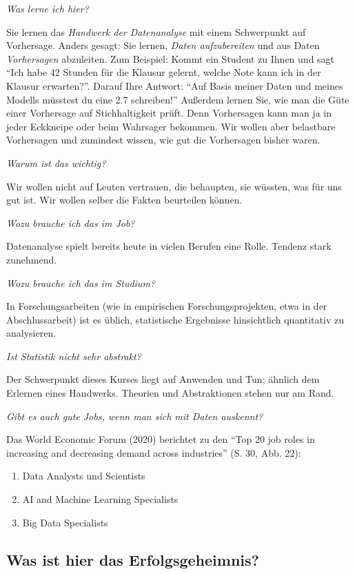 \documentclass[
  letterpaper,
  oneside,
  open=any]{scrbook}
\providecommand{\tightlist}{%
  \setlength{\itemsep}{0pt}\setlength{\parskip}{0pt}}\usepackage{longtable,booktabs,array}
\theoremstyle{definition}
\theoremstyle{definition}
\theoremstyle{definition}
\theoremstyle{remark}
\begin{document}
\emph{Was lerne ich hier?}

Sie lernen das \emph{Handwerk der Datenanalyse} mit einem Schwerpunkt
auf Vorhersage. Anders gesagt: Sie lernen, \emph{Daten aufzubereiten}
und aus Daten \emph{Vorhersagen} abzuleiten. Zum Beispiel: Kommt ein
Student zu Ihnen und sagt \enquote{Ich habe 42 Stunden für die Klausur
gelernt, welche Note kann ich in der Klausur erwarten?}. Darauf Ihre
Antwort: \enquote{Auf Basis meiner Daten und meines Modells müsstest du
eine 2.7 schreiben!} Außerdem lernen Sie, wie man die Güte einer
Vorhersage auf Stichhaltigkeit prüft. Denn Vorhersagen kann man ja in
jeder Eckkneipe oder beim Wahrsager bekommen. Wir wollen aber belastbare
Vorhersagen und zumindest wissen, wie gut die Vorhersagen bisher waren.

\emph{Warum ist das wichtig?}

Wir wollen nicht auf Leuten vertrauen, die behaupten, sie wüssten, was
für uns gut ist. Wir wollen selber die Fakten beurteilen können.

\emph{Wozu brauche ich das im Job?}

Datenanalyse spielt bereits heute in vielen Berufen eine Rolle. Tendenz
stark zunehmend.

\emph{Wozu brauche ich das im Studium?}

In Forschungsarbeiten (wie in empirischen Forschungsprojekten, etwa in
der Abschlussarbeit) ist es üblich, statistische Ergebnisse hinsichtlich
quantitativ zu analysieren.

\emph{Ist Statistik nicht sehr abstrakt?}

Der Schwerpunkt dieses Kurses liegt auf Anwenden und Tun; ähnlich dem
Erlernen eines Handwerks. Theorien und Abstraktionen stehen nur am Rand.

\emph{Gibt es auch gute Jobs, wenn man sich mit Daten auskennt?}

Das World Economic Forum (2020) berichtet zu den \enquote{Top 20 job
roles in increasing and decreasing demand across industries} (S. 30,
Abb. 22):

\begin{enumerate}
\def\labelenumi{\arabic{enumi}.}
\tightlist
\item
  Data Analysts und Scientists
\item
  AI and Machine Learning Specialists
\item
  Big Data Specialists
\end{enumerate}

\subsection{Was ist hier das
Erfolgsgeheimnis?}\label{was-ist-hier-das-erfolgsgeheimnis}
\end{document}

